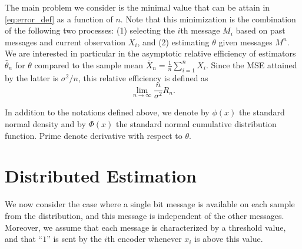 \documentclass[letterpaper, conference]{IEEEtran}      %
\begin{document}
The main problem we consider is the minimal value that can be attain in \eqref{eq:error_def} as a function of $n$. Note that this minimization is the combination of the following two processes: (1) selecting the $i$th message $M_i$ based on past messages and current observation $X_i$, and (2) estimating $\theta$ given messages $M^n$. We are interested in particular in the asymptotic relative efficiency of estimators $\widehat{\theta}_n$ for $\theta$ compared to the sample mean $\bar{X}_n = \frac{1}{n} \sum_{i=1}^n X_i$. Since the MSE attained by the latter is $\sigma^2/n$, this relative efficiency is defined as
\begin{equation}
 \lim_{n \rightarrow \infty} \frac{n}{\sigma^2}  R_n. 
\label{eq:relative_efficiency}
\end{equation}

In addition to the notations defined above, we denote by $\phi(x)$ the standard normal density and by $\Phi(x)$ the standard normal cumulative distribution function. Prime denote derivative with respect to $\theta$.


\section{Distributed Estimation \label{sec:distributed}}
We now consider the case where a single bit message is available on each sample from the distribution, and this message is independent of the other messages. Moreover, we assume that each message is characterized by a threshold value, and that ``$1$'' is sent by the $i$th encoder whenever $x_i$ is above this value. 
\end{document}
